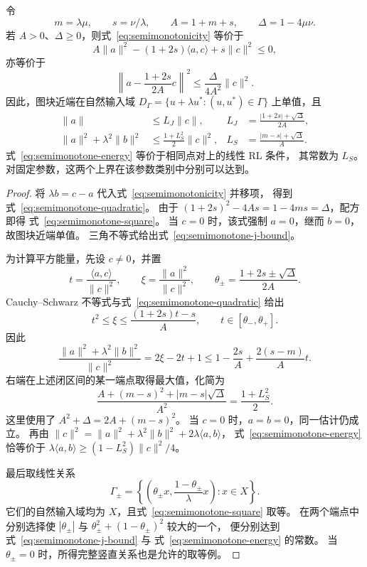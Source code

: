 \begin{proposition}[二参数条件下的近端差与平方能量]
\label{prop:semimonotone-square}
令
\[
 m=\lambda\mu,\qquad s=\nu/\lambda,\qquad
 A=1+m+s,\qquad\Delta=1-4\mu\nu.
\]
若 $A>0$、$\Delta\ge0$，则式~\eqref{eq:semimonotonicity} 等价于
\begin{equation}
 A\|a\|^2-(1+2s)\langle a,c\rangle+s\|c\|^2\le0,
 \label{eq:semimonotone-quadratic}
\end{equation}
亦等价于
\begin{equation}
 \left\|a-\frac{1+2s}{2A}c\right\|^2
 \le\frac{\Delta}{4A^2}\|c\|^2.
 \label{eq:semimonotone-square}
\end{equation}
因此，图块近端在自然输入域
$D_\Gamma=\{u+\lambda u^*:(u,u^*)\in\Gamma\}$ 上单值，且
\begin{align}
 \|a\|&\le L_J\|c\|,
 & L_J&=\frac{|1+2s|+\sqrt\Delta}{2A},
 \label{eq:semimonotone-j-bound}\\
 \|a\|^2+\lambda^2\|b\|^2
 &\le\frac{1+L_S^2}{2}\|c\|^2,
 & L_S&=\frac{|m-s|+\sqrt\Delta}{A}.
 \label{eq:semimonotone-energy}
\end{align}
式~\eqref{eq:semimonotone-energy} 等价于相同点对上的线性 RL 条件，
其常数为 $L_S$。对固定参数，这两个上界在该参数类别中分别可以达到。
\end{proposition}

\begin{proof}
将 $\lambda b=c-a$ 代入式~\eqref{eq:semimonotonicity} 并移项，
得到式~\eqref{eq:semimonotone-quadratic}。
由于
$(1+2s)^2-4As=1-4ms=\Delta$，配方即得
式~\eqref{eq:semimonotone-square}。
当 $c=0$ 时，该式强制 $a=0$，继而 $b=0$，故图块近端单值。
三角不等式给出式~\eqref{eq:semimonotone-j-bound}。

为计算平方能量，先设 $c\ne0$，并置
\[
 t=\frac{\langle a,c\rangle}{\|c\|^2},\qquad
 \xi=\frac{\|a\|^2}{\|c\|^2},\qquad
 \theta_\pm=\frac{1+2s\pm\sqrt\Delta}{2A}.
\]
Cauchy--Schwarz 不等式与式~\eqref{eq:semimonotone-quadratic} 给出
\[
 t^2\le\xi\le\frac{(1+2s)t-s}{A},
 \qquad t\in[\theta_-,\theta_+].
\]
因此
\[
 \frac{\|a\|^2+\lambda^2\|b\|^2}{\|c\|^2}
 =2\xi-2t+1
 \le 1-\frac{2s}{A}+\frac{2(s-m)}{A}t.
\]
右端在上述闭区间的某一端点取得最大值，化简为
\[
 \frac{A+(m-s)^2+|m-s|\sqrt\Delta}{A^2}
 =\frac{1+L_S^2}{2}.
\]
这里使用了 $A^2+\Delta=2A+(m-s)^2$。
当 $c=0$ 时，$a=b=0$，同一估计仍成立。
再由
$\|c\|^2=\|a\|^2+\lambda^2\|b\|^2+2\lambda\langle a,b\rangle$，
式~\eqref{eq:semimonotone-energy} 恰等价于
$\lambda\langle a,b\rangle\ge(1-L_S^2)\|c\|^2/4$。

最后取线性关系
\[
 \Gamma_\pm=
 \left\{\left(\theta_\pm x,\frac{1-\theta_\pm}{\lambda}x\right):x\in X\right\}.
\]
它们的自然输入域均为 $X$，且式~\eqref{eq:semimonotone-square} 取等。
在两个端点中分别选择使 $|\theta_\pm|$ 与
$\theta_\pm^2+(1-\theta_\pm)^2$ 较大的一个，
便分别达到式~\eqref{eq:semimonotone-j-bound} 与
式~\eqref{eq:semimonotone-energy} 的常数。
当 $\theta_\pm=0$ 时，所得完整竖直关系也是允许的取等例。
\end{proof}

